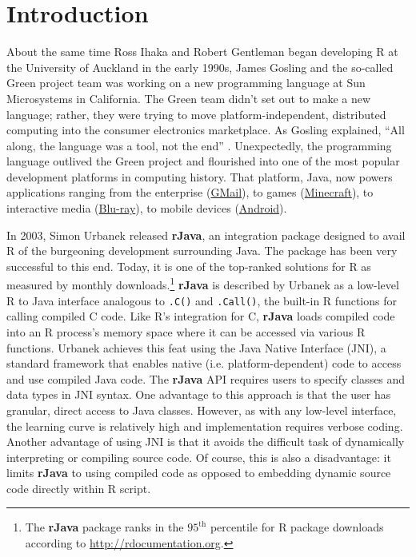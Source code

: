 \chapter{Introduction}

About the same time Ross Ihaka and Robert Gentleman began developing R at the University of Auckland in the early 1990s, James Gosling and the so-called Green project team was working on a new programming language at Sun Microsystems in California. The Green team didn't set out to make a new language; rather, they were trying to move platform-independent, distributed computing into the consumer electronics marketplace. As Gosling explained, ``All along, the language was a tool, not the end'' \citep{javainsidestory}. Unexpectedly, the programming language outlived the Green project and flourished into one of the most popular development platforms in computing history. That platform, Java, now powers applications ranging from the enterprise (\href{https://www.google.com/gmail/about/}{GMail}), to games (\href{https://minecraft.net}{Minecraft}), to interactive media (\href{https://en.wikipedia.org/wiki/Blu-ray}{Blu-ray}), to mobile devices (\href{https://www.android.com/}{Android}).

In 2003, Simon Urbanek released \textbf{rJava}, an integration package designed to avail R of the burgeoning development surrounding Java. The package has been very successful to this end. Today, it is one of the top-ranked solutions for R as measured by monthly downloads.\footnote{The \textbf{rJava} package ranks in the $95^{\text{th}}$ percentile for R package downloads according to \href{http://rdocumentation.org}{http://rdocumentation.org}.} \textbf{rJava} is described by Urbanek as a low-level R to Java interface analogous to \texttt{.C()} and \texttt{.Call()}, the built-in R functions for calling compiled C code. Like R's integration for C, \textbf{rJava} loads compiled code into an R process's memory space where it can be accessed via various R functions. Urbanek achieves this feat using the Java Native Interface (JNI), a standard framework that enables native (i.e. platform-dependent) code to access and use compiled Java code. The \textbf{rJava} API requires users to specify classes and data types in JNI syntax. One advantage to this approach is that the user has granular, direct access to Java classes. However, as with any low-level interface, the learning curve is relatively high and implementation requires verbose coding. Another advantage of using JNI is that it avoids the difficult task of dynamically interpreting or compiling source code. Of course, this is also a disadvantage: it limits \textbf{rJava} to using compiled code as opposed to embedding dynamic source code directly within R script.

